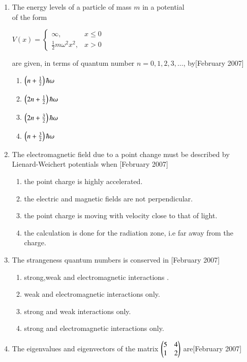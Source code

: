 \documentclass[journal]{IEEEtran}
\begin{document}
\begin{enumerate}
\item  The energy levels of a particle of mass $m$ in a potential \\of the form 

$
V(x) = 
\begin{cases} 
\infty, & x \leq 0 \\
\frac{1}{2} m \omega^2 x^2, & x > 0
\end{cases} $

are given, in terms of quantum number $n = 0, 1, 2, 3, \dots$, by\hfill[February 2007]

\begin{enumerate}
\item $ \left(n + \frac{1}{2}\right)\hbar\omega  $
\item $ \left(2n + \frac{1}{2}\right)\hbar\omega  $
\item $ \left(2n + \frac{3}{2}\right)\hbar\omega  $
\item $ \left(n + \frac{3}{2}\right)\hbar\omega $
\end{enumerate}

\item The electromagnetic field due to a point change must be described by \\Lienard-Weichert  potentials when \hfill[February 2007]
\begin{enumerate}
\item  the point charge is highly accelerated.
\item the electric and magnetic fields are not perpendicular.
\item the point charge is moving with velocity close to that of light.
\item the calculation is done for the radiation zone, i.e far away from the charge.
\end{enumerate}
\item The strangeness quantum numbers is conserved in \hfill[February 2007]
\begin{enumerate}
\item strong,weak and electromagnetic interactions .
    \item weak and electromagnetic interactions only.
    \item strong and weak interactions only.
    \item strong and electromagnetic interactions only.
\end{enumerate}
\item The eigenvalues and eigenvectors of the matrix   $\begin{pmatrix}
5 & 4 \\
1 & 2
\end{pmatrix}
$
are\hfill[February 2007]


\end{enumerate}
\end{document}
